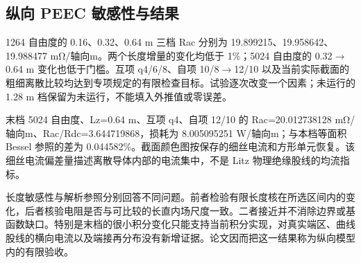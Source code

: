 \documentclass[11pt]{article}
\begin{document}
\subsection*{纵向 PEEC 敏感性与结果}
\hypertarget{06.peec_results.heading}{}
1264 自由度的 0.16、0.32、0.64 m 三档 Rac 分别为 19.899215、19.958642、19.988477 mΩ/轴向m。两个长度增量的变化均低于 1\%；5024 自由度的 0.32\(\to\)0.64 m 变化也低于门槛。互项 q4/6/8、自项 10/8\(\to\)12/10 以及当前实际截面的粗细离散比较均达到专项规定的有限检查目标。试验逐次改变一个因素；未运行的 1.28 m 档保留为未运行，不能填入外推值或零误差。


末档 5024 自由度、Lz=0.64 m、互项 q4、自项 12/10 的 Rac=20.012738128 mΩ/轴向m、Rac/Rdc=3.644719868，损耗为 8.005095251 W/轴向m；与本档等面积 Bessel 参照的差为 0.044582\%。截面颜色图按保存的细丝电流和方形单元恢复。该细丝电流偏差量描述离散导体内部的电流集中，不是 Litz 物理绝缘股线的均流指标。


长度敏感性与解析参照分别回答不同问题。前者检验有限长度核在所选区间内的变化，后者核验电阻是否与可比较的长直内场尺度一致。二者接近并不消除边界或基函数缺口。特别是末档的很小积分变化只能支持当前积分实现，对真实端区、曲线股线的横向电流以及端接再分布没有新增证据。论文因而把这一结果称为纵向模型内的有限验收。
\end{document}
